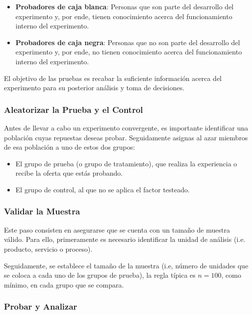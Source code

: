 \begin{itemize}
	\item \textbf{Probadores de caja blanca}: Personas que son parte del desarrollo
	      del experimento y, por ende, tienen conocimiento acerca del funcionamiento interno
	      del experimento.

	\item \textbf{Probadores de caja negra}: Personas que no son parte del desarrollo
	      del experimento y, por ende, no tienen conocimiento acerca del funcionamiento
	      interno del experimento.
\end{itemize}

El objetivo de las pruebas es recabar la suficiente información acerca del
experimento para su posterior análisis y toma de decisiones.

\subsubsection{Aleatorizar la Prueba y el Control}

Antes de llevar a cabo un experimento convergente, es importante identificar una
población cuyas repuestas deseas probar. Seguidamente asignas al azar miembros de
esa población a uno de estos dos grupos:

\begin{itemize}
	\item El grupo de prueba (o grupo de tratamiento), que realiza la experiencia
	      o recibe la oferta que estás probando.

	\item El grupo de control, al que no se aplica el factor testeado.
\end{itemize}

\subsubsection{Validar la Muestra}

Este paso consisten en asegurarse que se cuenta con un tamaño de muestra válido.
Para ello, primeramente es necesario identificar la unidad de análisis (i.e. producto,
servicio o proceso).

Seguidamente, se establece el tamaño de la muestra (i.e, número de unidades que
se coloca a cada uno de los grupos de prueba), la regla típica es $n = 100$, como
mínimo, en cada grupo que se compara.

\subsubsection{Probar y Analizar}

